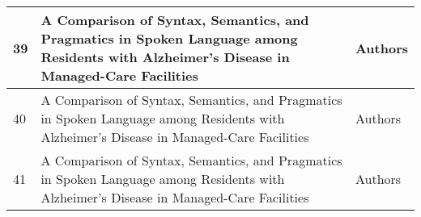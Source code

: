 \documentclass[12pt]{article}
\begin{document}
\begin{table}
\begin{tabular}{ p{1cm} | p{6cm} | p{6cm}}
	39 & A Comparison of Syntax, Semantics, and Pragmatics in Spoken Language among Residents with Alzheimer's Disease in Managed-Care Facilities & Authors \\ \hline
	40 & A Comparison of Syntax, Semantics, and Pragmatics in Spoken Language among Residents with Alzheimer's Disease in Managed-Care Facilities & Authors \\ \hline
	41 & A Comparison of Syntax, Semantics, and Pragmatics in Spoken Language among Residents with Alzheimer's Disease in Managed-Care Facilities & Authors \\ \hline
	\end{tabular}
\end{table}
\end{document}
